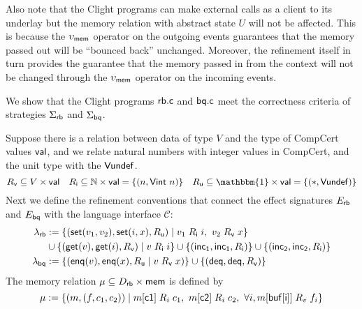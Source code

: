 \documentclass[acmsmall,review,anonymous]{acmart}\settopmatter{printfolios=true,printccs=false,printacmref=false}
\begin{document}
Also note that the Clight programs
can make external calls as a client to its underlay
but the memory relation with abstract state $U$
will not be affected.
This is because
the $\upsilon_{ \mathsf{mem} }$ operator
on the outgoing events
guarantees that
the memory passed out
will be ``bounced back'' unchanged.
Moreover,
the refinement itself in turn
provides the guarantee
that the memory passed in from the context
will not be changed
through the $\upsilon_{ \mathsf{mem} }$ operator
on the incoming events.

\begin{example}
  We show that the Clight programs $ \mathsf{rb.c} $ and $ \mathsf{bq.c} $
  meet the correctness criteria of strategies
  $\Sigma_{ \mathsf{rb} }$ and $\Sigma_{ \mathsf{bq} }$.

  Suppose there is a relation between
  data of type $V$ and
  the type of CompCert values $ \mathsf{val} $,
  and we relate natural numbers with integer values in CompCert,
  and the unit type with the $ \mathsf{Vundef} $.
  \[
    R_\kw{v} \subseteq V \times \kw{val}
    \quad
    R_\kw{i} \subseteq \mathbb{N} \times \kw{val} = \{(n, \kw{Vint}\ n) \}
    \quad
    R_\kw{u} \subseteq \mathbbm{1} \times \kw{val} = \{(*, \kw{Vundef}) \}
  \]
  Next we define the refinement conventions that connect the effect signatures
  $E_{ \mathsf{rb} }$ and $E_{ \mathsf{bq} }$ with the language interface $\mathcal{C}$:
  \begin{align*}
    \lambda_{ \mathsf{rb} }
    & := \{ ( \mathsf{set} (v_1, v_2),  \mathsf{set} (i, x), R_{ \mathsf{u} }) \mid
      v_1 \mathrel{R_{ \mathsf{i} }}i,\ v_2\mathrel{R_{ \mathsf{v} }}x\} \\
    & \cup \{ ( \mathsf{get} (v),  \mathsf{get} (i), R_{ \mathsf{v} })\mid
      v\mathrel{R_{ \mathsf{i} }}i\} \cup \{ ( \mathsf{inc_1} ,  \mathsf{inc_1} , R_{ \mathsf{i} })\}
      \cup \{ ( \mathsf{inc_2} ,  \mathsf{inc_2} , R_{ \mathsf{i} })\}\\
    \lambda_{ \mathsf{bq} }
    & := \{ ( \mathsf{enq} (v),  \mathsf{enq} (x), R_{ \mathsf{u} } \mid
      v\mathrel{R_{ \mathsf{v} }}x)\} \cup \{ ( \mathsf{deq} ,  \mathsf{deq} , R_{ \mathsf{v} })\}
  \end{align*}
  The memory relation
  $\mu \subseteq D_{ \mathsf{rb} } \times  \mathsf{mem} $
  is defined by
  \[
    \mu := \{ (m, (f,c_1, c_2))
    \mid m[ \mathsf{c1} ]\mathrel{R_i}c_1,
    \ m[ \mathsf{c2} ]\mathrel{R_i}c_2,
    \ \forall i, m[ \mathsf{buf[i]} ]\mathrel{R_v} f_i\}
  \]

\end{example}
\end{document}
